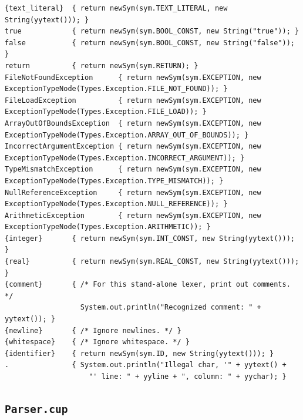 \documentclass{report}
\begin{document}
\begin{verbatim}
{text_literal}  { return newSym(sym.TEXT_LITERAL, new String(yytext())); }
true            { return newSym(sym.BOOL_CONST, new String("true")); }
false           { return newSym(sym.BOOL_CONST, new String("false")); }
return          { return newSym(sym.RETURN); }
FileNotFoundException      { return newSym(sym.EXCEPTION, new ExceptionTypeNode(Types.Exception.FILE_NOT_FOUND)); }
FileLoadException          { return newSym(sym.EXCEPTION, new ExceptionTypeNode(Types.Exception.FILE_LOAD)); }
ArrayOutOfBoundsException  { return newSym(sym.EXCEPTION, new ExceptionTypeNode(Types.Exception.ARRAY_OUT_OF_BOUNDS)); } 
IncorrectArgumentException { return newSym(sym.EXCEPTION, new ExceptionTypeNode(Types.Exception.INCORRECT_ARGUMENT)); }
TypeMismatchException      { return newSym(sym.EXCEPTION, new ExceptionTypeNode(Types.Exception.TYPE_MISMATCH)); }
NullReferenceException     { return newSym(sym.EXCEPTION, new ExceptionTypeNode(Types.Exception.NULL_REFERENCE)); }
ArithmeticException        { return newSym(sym.EXCEPTION, new ExceptionTypeNode(Types.Exception.ARITHMETIC)); }
{integer}       { return newSym(sym.INT_CONST, new String(yytext())); }
{real}          { return newSym(sym.REAL_CONST, new String(yytext())); }
{comment}       { /* For this stand-alone lexer, print out comments. */
                  System.out.println("Recognized comment: " + yytext()); }
{newline}       { /* Ignore newlines. */ }
{whitespace}    { /* Ignore whitespace. */ }
{identifier}    { return newSym(sym.ID, new String(yytext())); }
.               { System.out.println("Illegal char, '" + yytext() +
                    "' line: " + yyline + ", column: " + yychar); }
\end{verbatim}

\subsection{\texttt{Parser.cup}}
\end{document}
